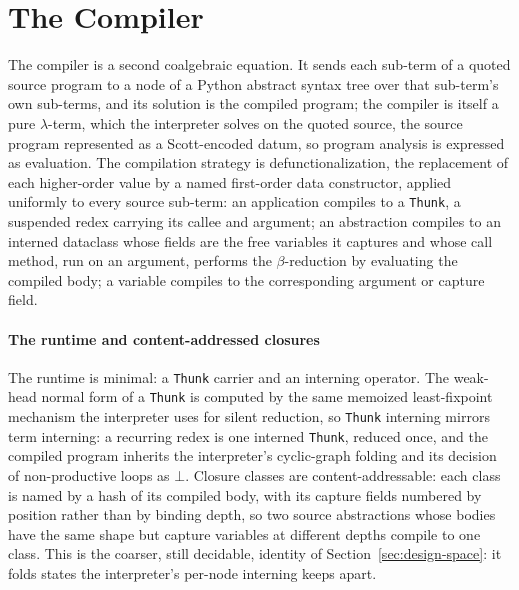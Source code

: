 \section{The Compiler}\label{app:compiler}
The compiler is a second coalgebraic equation. It sends each sub-term of a quoted source program to a node of a Python abstract syntax tree over that sub-term's own sub-terms, and its solution is the compiled program; the compiler is itself a pure $\lambda$-term, which the interpreter solves on the quoted source, the source program represented as a Scott-encoded datum, so program analysis is expressed as evaluation. The compilation strategy is defunctionalization, the replacement of each higher-order value by a named first-order data constructor, applied uniformly to every source sub-term: an application compiles to a \texttt{Thunk}, a suspended redex carrying its callee and argument; an abstraction compiles to an interned dataclass whose fields are the free variables it captures and whose call method, run on an argument, performs the $\beta$-reduction by evaluating the compiled body; a variable compiles to the corresponding argument or capture field.

\paragraph{The runtime and content-addressed closures}
The runtime is minimal: a \texttt{Thunk} carrier and an interning operator. The weak-head normal form of a \texttt{Thunk} is computed by the same memoized least-fixpoint mechanism the interpreter uses for silent reduction, so \texttt{Thunk} interning mirrors term interning: a recurring redex is one interned \texttt{Thunk}, reduced once, and the compiled program inherits the interpreter's cyclic-graph folding and its decision of non-productive loops as $\bot$. Closure classes are content-addressable: each class is named by a hash of its compiled body, with its capture fields numbered by position rather than by binding depth, so two source abstractions whose bodies have the same shape but capture variables at different depths compile to one class. This is the coarser, still decidable, identity of Section~\ref{sec:design-space}: it folds states the interpreter's per-node interning keeps apart.

